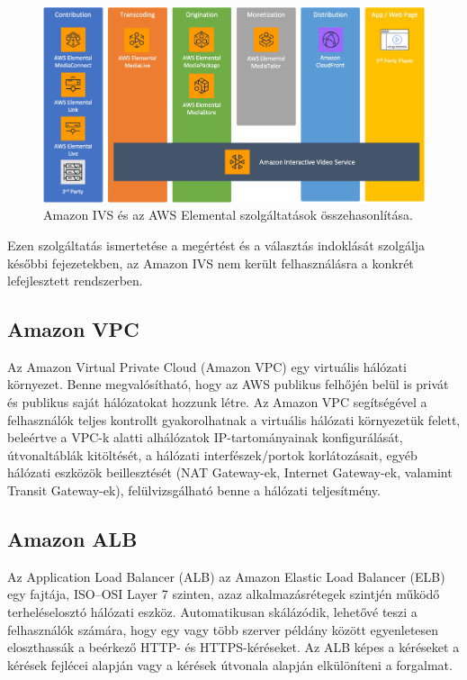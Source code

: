 \begin{figure}[ht]
	\centering
	\includegraphics[width=120mm, keepaspectratio]{figures/aws_media.png}
	\caption{Amazon IVS és az AWS Elemental szolgáltatások összehasonlítása.}
	\label{fig:ivselemental}
\end{figure}

Ezen szolgáltatás ismertetése a megértést és a választás indoklását szolgálja későbbi fejezetekben, az Amazon IVS nem került felhasználásra a konkrét lefejlesztett rendszerben.

\subsection{Amazon VPC}

Az Amazon Virtual Private Cloud (Amazon VPC) egy virtuális hálózati környezet. Benne megvalósítható, hogy az AWS publikus felhőjén belül is privát és publikus saját hálózatokat hozzunk létre. Az Amazon VPC segítségével a felhasználók teljes kontrollt gyakorolhatnak a virtuális hálózati környezetük felett, beleértve a VPC-k alatti alhálózatok IP-tartományainak konfigurálását, útvonaltáblák kitöltését, a hálózati interfészek/portok korlátozásait, egyéb hálózati eszközök beillesztését (NAT Gateway-ek, Internet Gateway-ek, valamint Transit Gateway-ek), felülvizsgálható benne a hálózati teljesítmény.

\subsection{Amazon ALB}

Az Application Load Balancer (ALB) az Amazon Elastic Load Balancer (ELB) egy fajtája, ISO--OSI Layer 7 szinten, azaz alkalmazásrétegek szintjén működő terheléselosztó hálózati eszköz. Automatikusan skálázódik, lehetővé teszi a felhasználók számára, hogy egy vagy több szerver példány között egyenletesen eloszthassák a beérkező HTTP- és HTTPS-kéréseket. Az ALB képes a kéréseket a kérések fejlécei alapján vagy a kérések útvonala alapján elkülöníteni a forgalmat.

